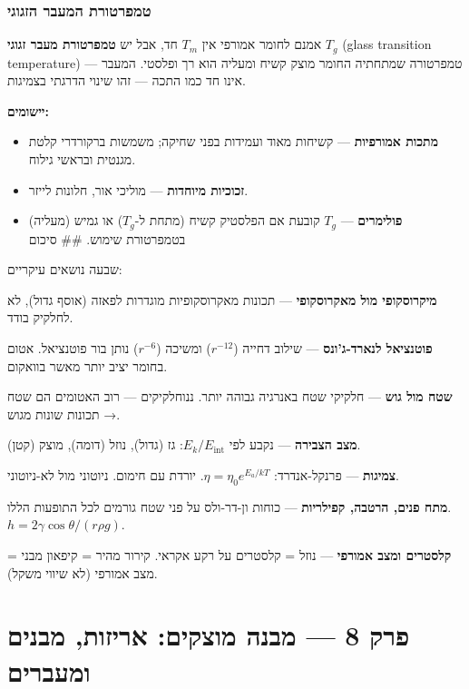 \documentclass[
  hebrew,
  letterpaper,
  DIV=11,
  numbers=noendperiod]{scrreprt}
\providecommand{\tightlist}{%
  \setlength{\itemsep}{0pt}\setlength{\parskip}{0pt}}
\begin{document}
\subsection{טמפרטורת המעבר
הזגוגי}\label{ux5d8ux5deux5e4ux5e8ux5d8ux5d5ux5e8ux5ea-ux5d4ux5deux5e2ux5d1ux5e8-ux5d4ux5d6ux5d2ux5d5ux5d2ux5d9}

אמנם לחומר אמורפי אין \(T_m\) חד, אבל יש \textbf{טמפרטורת מעבר זגוגי}
\(T_g\) (glass transition temperature) --- טמפרטורה שמתחתיה החומר מוצק
קשיח ומעליה הוא רך ופלסטי. המעבר אינו חד כמו התכה --- זהו שינוי הדרגתי
בצמיגות.

\textbf{יישומים:}

\begin{itemize}
\tightlist
\item
  \textbf{מתכות אמורפיות} --- קשיחות מאוד ועמידות בפני שחיקה; משמשות
  ברקורדרי קלטת מגנטית ובראשי גילוח.
\item
  \textbf{זכוכיות מיוחדות} --- מוליכי אור, חלונות לייזר.
\item
  \textbf{פולימרים} --- \(T_g\) קובעת אם הפלסטיק קשיח (מתחת ל-\(T_g\))
  או גמיש (מעליה) בטמפרטורת שימוש. \#\# סיכום
\end{itemize}

שבעה נושאים עיקריים:

\textbf{מיקרוסקופי מול מאקרוסקופי} --- תכונות מאקרוסקופיות מוגדרות לפאזה
(אוסף גדול), לא לחלקיק בודד.

\textbf{פוטנציאל לנארד-ג'ונס} --- שילוב דחייה (\(r^{-12}\)) ומשיכה
(\(r^{-6}\)) נותן בור פוטנציאל. אטום בחומר יציב יותר מאשר בוואקום.

\textbf{שטח מול גוש} --- חלקיקי שטח באנרגיה גבוהה יותר. ננוחלקיקים ---
רוב האטומים הם שטח → תכונות שונות מגוש.

\textbf{מצב הצבירה} --- נקבע לפי \(E_k/E_\text{int}\): גז (גדול), נוזל
(דומה), מוצק (קטן).

\textbf{צמיגות} --- פרנקל-אנדרד: \(\eta = \eta_0 e^{E_a/kT}\). יורדת עם
חימום. ניוטוני מול לא-ניוטוני.

\textbf{מתח פנים, הרטבה, קפילריות} --- כוחות ון-דר-ולס על פני שטח גורמים
לכל התופעות הללו. \(h = 2\gamma\cos\theta/(r\rho g)\).

\textbf{קלסטרים ומצב אמורפי} --- נוזל = קלסטרים על רקע אקראי. קירור מהיר
= קיפאון מבני = מצב אמורפי (לא שיווי משקל).


\chapter{פרק 8 --- מבנה מוצקים: אריזות, מבנים
ומעברים}\label{ux5e4ux5e8ux5e7-8-ux5deux5d1ux5e0ux5d4-ux5deux5d5ux5e6ux5e7ux5d9ux5dd-ux5d0ux5e8ux5d9ux5d6ux5d5ux5ea-ux5deux5d1ux5e0ux5d9ux5dd-ux5d5ux5deux5e2ux5d1ux5e8ux5d9ux5dd}
\end{document}
